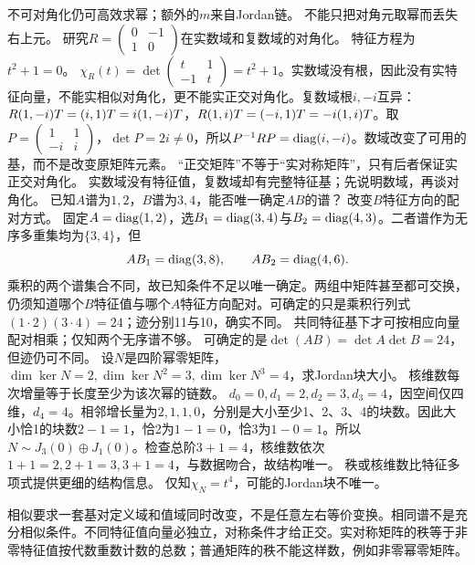 {不可对角化仍可高效求幂；额外的$m$来自Jordan链。}
{不能只把对角元取幂而丢失右上元。}
{研究$R=\begin{pmatrix}0&-1\\1&0\end{pmatrix}$在实数域和复数域的对角化。}
{特征方程为$t^2+1=0$。}
{$\chi_R(t)=\det\begin{pmatrix}t&1\\-1&t\end{pmatrix}=t^2+1$。实数域没有根，因此没有实特征向量，不能实相似对角化，更不能实正交对角化。复数域根$i,-i$互异：$R(1,-i)T=(i,1)T=i(1,-i)T$，$R(1,i)T=(-i,1)T=-i(1,i)T$。取$P=\begin{pmatrix}1&1\\-i&i\end{pmatrix}$，$\det P=2i\ne0$，所以$P^{-1} RP=\operatorname{diag}(i,-i)$。数域改变了可用的基，而不是改变原矩阵元素。}
{“正交矩阵”不等于“实对称矩阵”，只有后者保证实正交对角化。}
{实数域没有特征值，复数域却有完整特征基；先说明数域，再谈对角化。}
{已知$A$谱为$1,2$，$B$谱为$3,4$，能否唯一确定$AB$的谱？}
{改变$B$特征方向的配对方式。}
{固定$A=\operatorname{diag}(1,2)$，选$B_1=\operatorname{diag}(3,4)$与$B_2=\operatorname{diag}(4,3)$。二者谱作为无序多重集均为$\{3,4\}$，但
\[AB_1=\operatorname{diag}(3,8),\qquad AB_2=\operatorname{diag}(4,6).\]
乘积的两个谱集合不同，故已知条件不足以唯一确定。两组中矩阵甚至都可交换，仍须知道哪个$B$特征值与哪个$A$特征方向配对。可确定的只是乘积行列式$(1\cdot2)(3\cdot4)=24$；迹分别11与10，确实不同。}
{共同特征基下才可按相应向量配对相乘；仅知两个无序谱不够。}
{可确定的是$\det(AB)=\det A\det B=24$，但迹仍可不同。}
{设$N$是四阶幂零矩阵，$\dim\ker N=2,\dim\ker N^2=3,\dim\ker N^3=4$，求Jordan块大小。}
{核维数每次增量等于长度至少为该次幂的链数。}
{$d_0=0,d_1=2,d_2=3,d_3=4$，因空间仅四维，$d_4=4$。相邻增长量为$2,1,1,0$，分别是大小至少1、2、3、4的块数。因此大小恰1的块数$2-1=1$，恰2为$1-1=0$，恰3为$1-0=1$。所以$N\sim J_3(0)\oplus J_1(0)$。检查总阶$3+1=4$，核维数依次$1+1=2,2+1=3,3+1=4$，与数据吻合，故结构唯一。}
{秩或核维数比特征多项式提供更细的结构信息。}
{仅知$\chi_N=t^4$，可能的Jordan块不唯一。}


\begin{warning}
相似要求一套基对定义域和值域同时改变，不是任意左右等价变换。相同谱不是充分相似条件。不同特征值向量必独立，对称条件才给正交。实对称矩阵的秩等于非零特征值按代数重数计数的总数；普通矩阵的秩不能这样数，例如非零幂零矩阵。
\end{warning}


